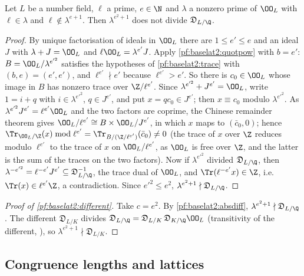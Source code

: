 \begin{lemma}\label{pf:baselat2:absdiff}
Let $L$ be a number field, $\ell$ a prime, $e\in\N$ and $\lambda$ a nonzero prime of $\OO_L$ with $\ell\in\lambda$ and
$\ell\notin\lambda^{e+1}$. Then $\lambda^{e^2+1}$ does not divide $\mathfrak D_{L/\Q}$.
\end{lemma}

\begin{proof}
By unique factorisation of ideals in $\OO_L$ there are
$1\le e'\le e$ and an ideal $J$ with $\lambda+J=\OO_L$ and $\ell\OO_L=\lambda^{e'}J$. Apply \cref{pf:baselat2:quotpow}
with $b=e'$: $B=\OO_L/\lambda^{e'^2}$ satisfies the hypotheses of \cref{pf:baselat2:trace} with $(b,e)=(e',e')$, and
$\ell^{e'}\nmid e'$ because $\ell^{e'}>e'$. So there is $c_0\in\OO_L$ whose image in $B$ has nonzero trace over
$\Z/\ell^{e'}$. Since $\lambda^{e'^2}+J^{e'}=\OO_L$, write $1=i+q$ with $i\in\lambda^{e'^2}$, $q\in J^{e'}$, and put
$x=qc_0\in J^{e'}$; then $x\equiv c_0$ modulo $\lambda^{e'^2}$. As $\lambda^{e'^2}J^{e'}=\ell^{e'}\OO_L$ and the two
factors are coprime, the Chinese remainder theorem gives $\OO_L/\ell^{e'}\cong B\times\OO_L/J^{e'}$, in which $x$
maps to $(\bar c_0,0)$; hence $\Tr_{\OO_L/\Z}(x)\bmod\ell^{e'}=\Tr_{B/(\Z/\ell^{e'})}(\bar c_0)\ne0$
(the trace of $x$ over $\Z$ reduces modulo $\ell^{e'}$ to the trace of $x$ on $\OO_L/\ell^{e'}$, as $\OO_L$ is free
over $\Z$, and the latter is the sum of the traces on the two factors). Now if $\lambda^{e'^2}$ divided $\mathfrak D_{L/\Q}$, then
$\lambda^{-e'^2}=\ell^{-e'}J^{e'}\subseteq\mathfrak D_{L/\Q}^{-1}$, the trace dual of $\OO_L$, and
$\Tr(\ell^{-e'}x)\in\Z$, i.e.\ $\Tr(x)\in\ell^{e'}\Z$, a contradiction. Since $e'^2\le e^2$,
$\lambda^{e^2+1}\nmid\mathfrak D_{L/\Q}$.
\end{proof}

\begin{proof}[Proof of \cref{pf:baselat2:different}]
Take $c=e^2$. By \cref{pf:baselat2:absdiff}, $\lambda^{e^2+1}\nmid\mathfrak D_{L/\Q}$. The different $\mathfrak D_{L/K}$
divides $\mathfrak D_{L/\Q}=\mathfrak D_{L/K}\,\mathfrak D_{K/\Q}\OO_L$ (transitivity of the different, \cite[Ch.~III, \S4]{Serre1979}), so $\lambda^{e^2+1}\nmid\mathfrak D_{L/K}$.
\end{proof}

\subsection{Congruence lengths and lattices}\label{sec:pf:baselat2:len}

